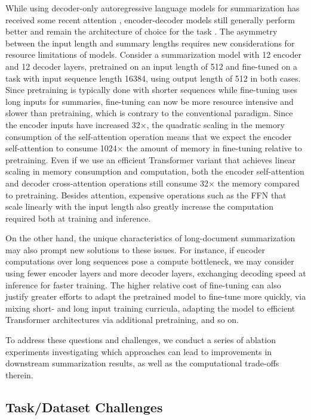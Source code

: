 \documentclass[11pt]{article}
\begin{document}
While using decoder-only autoregressive language models for summarization has received some recent attention \citep{radford2019gpt2,brown2020gpt3,chowdhery2022palm}, encoder-decoder models still generally perform better and remain the architecture of choice for the task \citep{wang2022language}.
The asymmetry between the input length and summary lengths requires new considerations for resource limitations of models.
Consider a summarization model with 12 encoder and 12 decoder layers, pretrained on an input length of 512 and fine-tuned on a task with input sequence length 16384, using output length of 512 in both cases.
Since pretraining is typically done with shorter sequences while fine-tuning uses long inputs for summaries, fine-tuning can now be more resource intensive and slower than pretraining, which is contrary to the conventional paradigm.
Since the encoder inputs have increased 32$\times$, the quadratic scaling in the memory consumption of the self-attention operation means that we expect the encoder self-attention to consume 1024$\times$ the amount of memory in fine-tuning relative to pretraining.
Even if we use an efficient Transformer variant that achieves linear scaling in memory consumption and computation, both the encoder self-attention and decoder cross-attention operations still consume 32$\times$ the memory compared to pretraining.
Besides attention, expensive operations such as the FFN that scale linearly with the input length also greatly increase the computation required both at training and inference.

On the other hand, the unique characteristics of long-document summarization may also prompt new solutions to these issues.
For instance, if encoder computations over long sequences pose a compute bottleneck, we may consider using fewer encoder layers and more decoder layers, exchanging decoding speed at inference for faster training.
The higher relative cost of fine-tuning can also justify greater efforts to adapt the pretrained model to fine-tune more quickly, via mixing short- and long input training curricula, adapting the model to efficient Transformer architectures via additional pretraining, and so on.

To address these questions and challenges, we conduct a series of ablation experiments investigating which approaches can lead to improvements in downstream summarization results, as well as the computational trade-offs therein.

\subsection{Task/Dataset Challenges}
\end{document}

